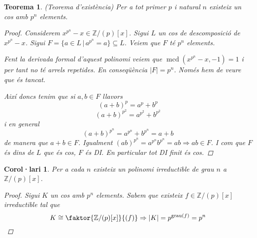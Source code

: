 \documentclass[a4paper,11pt]{report}
\newcommand{\barra}{\,|\,}
\DeclareMathOperator{\mcd}{mcd}
\newcommand{\ordre}[1]{|#1|}
\DeclareMathOperator{\grau}{grau}
\newcommand{\im}{\Rightarrow}
\theoremstyle{theorem}
\newtheorem{teorema}{\normalfont \sffamily\bfseries Teorema}[section]
\newtheorem{col}{\normalfont \sffamily\bfseries Corol·lari}[section]
\theoremstyle{definition}
\begin{document}
\begin{teorema}(Teorema d'existència)
Per a tot primer $p$ i natural $n$ existeix un cos amb $p^n$ elements.\begin{proof}
	Considerem $x^{p^n}-x\in \mathbb{Z}/(p)[x]$. Sigui $L$ un cos de descomposició de $x^{p^n}-x$. Sigui $F=\{a\in L\barra a^{p^n}=a\}\subseteq L$. Veiem que $F$ té $p^n$ elements.
	
	Fent la derivada formal d'aquest polinomi veiem que $\mcd(x^{p^n}-x,-1)=1$ i per tant no té arrels repetides.
	En conseqüència $\ordre{F}=p^n$. Només hem de veure que és tancat.
	
	Així doncs tenim que si $a,b\in F$ llavors $$(a+b)^p=a^p+b^p$$ $$(a+b)^{p^2}=a^{p^2}+b^{p^2}$$ i en general $$(a+b)^{p^n}=a^{p^n}+b^{p^n}=a+b$$
	de manera que $a+b\in F$. Igualment $(ab)^{p^n}=a^{p^n}b^{p^n}=ab\im ab\in F$. I com que $F$ és dins de $L$ que és cos, $F$ és DI. En particular tot DI finit és cos.
\end{proof}
\end{teorema}
\begin{col}
	Per a cada $n$ existeix un polinomi irreductible de grau $n$ a $\mathbb{Z}/(p)[x]$.
	\begin{proof}
		Sigui $K$ un cos amb $p^n$ elements. Sabem que existeix $f\in \mathbb{Z}/(p)[x]$ irreductible tal que $$K\cong \faktor{\mathbb{Z}/(p)[x]}{(f)}\im \ordre{K}=p^{\grau(f)}=p^n$$
	\end{proof}
\end{col}
\end{document}
